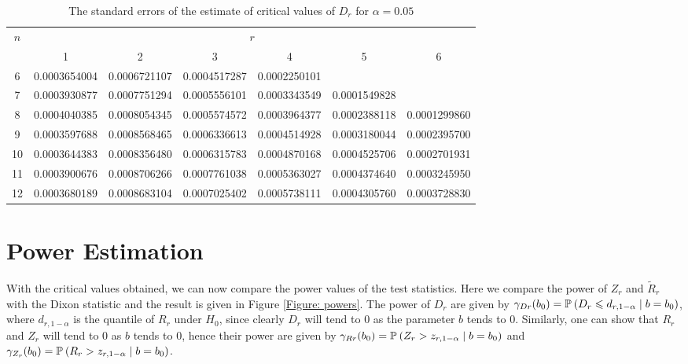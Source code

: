\documentclass{report}
\begin{document}
\begin{table}
        \centering
        \caption{The standard errors of the estimate of critical values of $D_r$ for $\alpha = 0.05$} \label{table: Dr standard error}
        \begin{tabular}{*{7}{c}}
                \toprule
                \multirow{2}{*}{$n$} & \multicolumn{6}{c}{$r$} \\
                                        \cline{2-7} 
                            & 1 & 2 & 3 & 4 & 5 & 6 \\
                \midrule
                6 & 0.0003654004 & 0.0006721107 & 0.0004517287 & 0.0002250101 &              &             \\
                7 & 0.0003930877 & 0.0007751294 & 0.0005556101 & 0.0003343549 & 0.0001549828  &             \\
                8 & 0.0004040385 & 0.0008054345 & 0.0005574572 & 0.0003964377 & 0.0002388118  & 0.0001299860 \\
                9 & 0.0003597688 & 0.0008568465 & 0.0006336613 & 0.0004514928 & 0.0003180044  & 0.0002395700 \\
               10 & 0.0003644383 & 0.0008356480 & 0.0006315783 & 0.0004870168 & 0.0004525706  & 0.0002701931 \\
       11 & 0.0003900676 & 0.0008706266 & 0.0007761038 & 0.0005363027 & 0.0004374640  & 0.0003245950 \\
       12 & 0.0003680189 & 0.0008683104 & 0.0007025402 & 0.0005738111 & 0.0004305760  & 0.0003728830 \\
  \bottomrule 
    \end{tabular}
\end{table}

\newpage
\section{Power Estimation}
With the critical values obtained, we can now compare the power values of the test statistics. Here we compare the power of $Z_r$ and $\tilde R_r$
with the Dixon statistic and the result is given in Figure \ref{Figure: powers}. The power of $D_r$ are given by
$\gamma_{Dr}(b_0) = \P{ D_r \leqslant d_{r,1-\alpha}\mid b = b_0}$,
where $d_{r,1-\alpha}$ is the quantile of $R_r$ under $H_0$, since clearly $D_r$ will tend
to $0$ as the parameter $b$ tends to $0$. Similarly, one can show that $R_r$ and $Z_r$ will tend to $0$
as $b$ tends to $0$, hence their power are given by $\gamma_{Rr}(b_0) = \P{ Z_r > z_{r,1-\alpha}\mid b = b_0}$
and $\gamma_{Z_r}(b_0) = \P{ R_r > z_{r,1-\alpha}\mid b = b_0}$.
\end{document}
